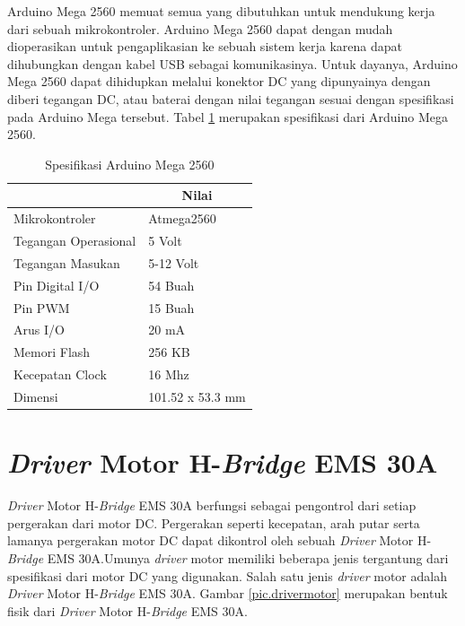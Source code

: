 Arduino Mega 2560 memuat semua yang dibutuhkan untuk mendukung kerja dari sebuah mikrokontroler. Arduino Mega 2560 dapat dengan mudah dioperasikan untuk pengaplikasian ke sebuah sistem kerja karena dapat dihubungkan dengan kabel USB sebagai komunikasinya. Untuk dayanya, Arduino Mega 2560 dapat dihidupkan melalui konektor DC yang dipunyainya dengan diberi tegangan DC, atau baterai dengan nilai tegangan sesuai dengan spesifikasi pada Arduino Mega tersebut. Tabel \ref{tbl.arduinomega} merupakan spesifikasi dari Arduino Mega 2560\cite{arduino2}.
\begin{table}[H]
	\centering
	\caption{ Spesifikasi Arduino Mega 2560 }
	\label{tbl.arduinomega}
	\begin{tabular}{|l|l|}
		\hline
		\rowcolor[HTML]{9B9B9B} 
		\multicolumn{1}{|c|}{\cellcolor[HTML]{9B9B9B}Keterangan} & \multicolumn{1}{c|}{\cellcolor[HTML]{9B9B9B}Nilai} \\ \hline
		Mikrokontroler                                           & Atmega2560                                         \\ \hline
		Tegangan Operasional                                     & 5 Volt                                             \\ \hline
		Tegangan Masukan                                         & 5-12 Volt                                          \\ \hline
		Pin Digital I/O                                          & 54 Buah                                            \\ \hline
		Pin PWM                                                  & 15 Buah                                            \\ \hline
		Arus I/O                                                 & 20 mA                                              \\ \hline
		Memori Flash                                             & 256 KB                                             \\ \hline
		Kecepatan Clock                                          & 16 Mhz                                             \\ \hline
		Dimensi                                                  & 101.52 x 53.3 mm                                   \\ \hline
	\end{tabular}
\end{table}
\section{\textit{Driver} Motor H-\textit{Bridge} EMS 30A}
\textit{Driver} Motor H-\textit{Bridge} EMS 30A berfungsi sebagai pengontrol dari setiap pergerakan dari motor DC. Pergerakan seperti kecepatan, arah putar serta lamanya pergerakan motor DC dapat dikontrol oleh sebuah \textit{Driver} Motor H-\textit{Bridge} EMS 30A.Umunya \textit{driver} motor memiliki beberapa jenis tergantung dari spesifikasi dari motor DC yang digunakan. Salah satu jenis \textit{driver} motor adalah \textit{Driver} Motor  H-\textit{Bridge} EMS 30A. Gambar \ref{pic.drivermotor} merupakan bentuk fisik dari \textit{Driver} Motor H-\textit{Bridge} EMS 30A.

